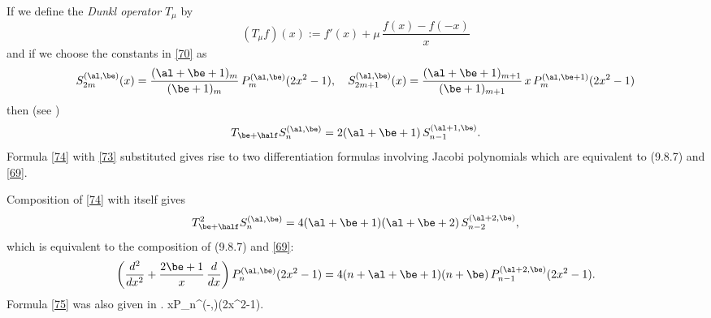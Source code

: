 \documentclass[envcountchap,graybox]{svmono}
\begin{document}
If we define the {\em Dunkl operator} $T_\mu$ by
\begin{equation}
(T_\mu f)(x):=f'(x)+\mu\,\frac{f(x)-f(-x)}x
\label{72}
\end{equation}
and if we choose the constants in \eqref{70} as
\begin{equation}
S_{2m}^{(\al,\be)}(x)=\frac{(\al+\be+1)_m}{(\be+1)_m}\, P_m^{(\al,\be)}(2x^2-1),\quad
S_{2m+1}^{(\al,\be)}(x)=\frac{(\al+\be+1)_{m+1}}{(\be+1)_{m+1}}\,
x\,P_m^{(\al,\be+1)}(2x^2-1)
\label{73}
\end{equation}
then (see \cite[(1.6)]{K5})
\begin{equation}
T_{\be+\half}S_n^{(\al,\be)}=2(\al+\be+1)\,S_{n-1}^{(\al+1,\be)}.
\label{74}
\end{equation}
Formula \eqref{74} with \eqref{73} substituted gives rise to two
differentiation formulas involving Jacobi polynomials which are equivalent to
(9.8.7) and \eqref{69}.

Composition of \eqref{74} with itself gives
\[
T_{\be+\half}^2S_n^{(\al,\be)}=4(\al+\be+1)(\al+\be+2)\,S_{n-2}^{(\al+2,\be)},
\]
which is equivalent to the composition of (9.8.7) and \eqref{69}:
\begin{equation}
\left(\frac{d^2}{dx^2}+\frac{2\be+1}x\,\frac d{dx}\right)P_n^{(\al,\be)}(2x^2-1)
=4(n+\al+\be+1)(n+\be)\,P_{n-1}^{(\al+2,\be)}(2x^2-1).
\label{75}
\end{equation}
Formula \eqref{75} was also given in .
xP_n^{(\lambda-,)}(2x^2-1).$$
\end{document}
